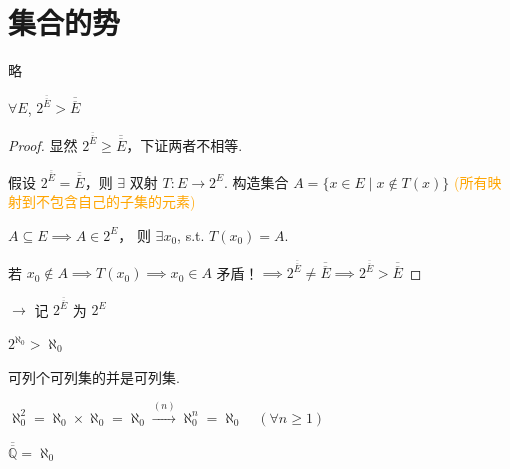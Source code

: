 \section{集合的势}

\begin{definition}
    略
\end{definition}

\begin{theorem}
    $\forall E$, $2^{\overline{\overline{E}}} > \overline{\overline{E}}$
\end{theorem}
\begin{proof}
显然 $2^{\overline{\overline{E}}} \ge \overline{\overline{E}}$，下证两者不相等. 

假设 $2^{\overline{\overline{E}}} = \overline{\overline{E}}$，则 $\exists$ 双射 $T: E \to 2^E$. 构造集合 $A = \{ x \in E \mid x \notin T(x) \}$
\textcolor{orange}{(所有映射到不包含自己的子集的元素)}

$A \subseteq E \implies A \in 2^E$， 则 $\exists x_0$, s.t. $T(x_0) = A$. 

若 $x_0 \notin A \implies T(x_0) \implies x_0 \in A$ 矛盾！$\implies 2^{\overline{\overline{E}}} \neq \overline{\overline{E}} \implies 2^{\overline{\overline{E}}} > \overline{\overline{E}}$
\end{proof}

$\to$ 记 $2^{\overline{\overline{E}}}$ 为 $2^E$

\begin{corollary}
    $2^{\aleph_0} > \aleph_0$
\end{corollary}

\begin{theorem}
    可列个可列集的并是可列集.
\end{theorem}
$\aleph_0^2 = \aleph_0 \times \aleph_0 = \aleph_0 \xrightarrow{(n)} \aleph_0^n = \aleph_0 \quad (\forall n \ge 1)$

\begin{corollary}
    $\overline{\overline{\mathbb{Q}}} = \aleph_0$
\end{corollary}

